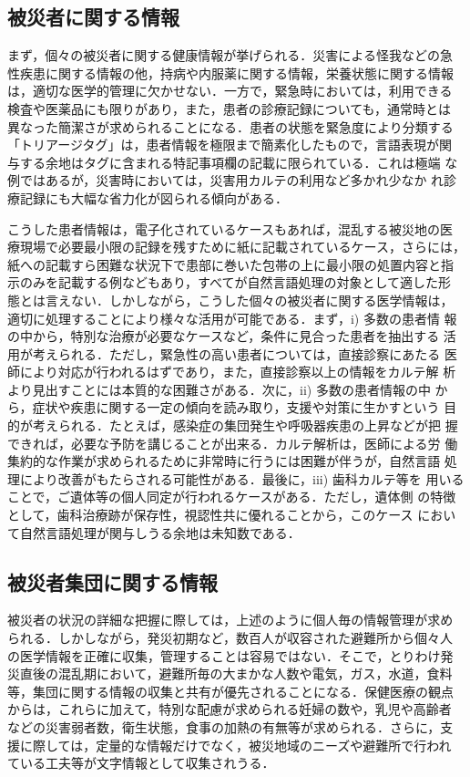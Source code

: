 \documentclass[japanese]{jnlp_1.4}
\begin{document}
\subsection{被災者に関する情報}

まず，個々の被災者に関する健康情報が挙げられる．災害による怪我などの急
性疾患に関する情報の他，持病や内服薬に関する情報，栄養状態に関する情報
は，適切な医学的管理に欠かせない．一方で，緊急時においては，利用できる
検査や医薬品にも限りがあり，また，患者の診療記録についても，通常時とは
異なった簡潔さが求められることになる．患者の状態を緊急度により分類する
「トリアージタグ」は，患者情報を極限まで簡素化したもので，言語表現が関
与する余地はタグに含まれる特記事項欄の記載に限られている．これは極端
な例ではあるが，災害時においては，災害用カルテの利用など多かれ少なか
れ診療記録にも大幅な省力化が図られる傾向がある．

こうした患者情報は，電子化されているケースもあれば，混乱する被災地の医
療現場で必要最小限の記録を残すために紙に記載されているケース，さらには，
紙への記載すら困難な状況下で患部に巻いた包帯の上に最小限の処置内容と指
示のみを記載する例などもあり，すべてが自然言語処理の対象として適した形
態とは言えない．しかしながら，こうした個々の被災者に関する医学情報は，
適切に処理することにより様々な活用が可能である．まず，i) 多数の患者情
報の中から，特別な治療が必要なケースなど，条件に見合った患者を抽出する
活用が考えられる．ただし，緊急性の高い患者については，直接診察にあたる
医師により対応が行われるはずであり，また，直接診察以上の情報をカルテ解
析より見出すことには本質的な困難さがある．次に，ii) 多数の患者情報の中
から，症状や疾患に関する一定の傾向を読み取り，支援や対策に生かすという
目的が考えられる．たとえば，感染症の集団発生や呼吸器疾患の上昇などが把
握できれば，必要な予防を講じることが出来る．カルテ解析は，医師による労
働集約的な作業が求められるために非常時に行うには困難が伴うが，自然言語
処理により改善がもたらされる可能性がある．最後に，iii) 歯科カルテ等を
用いることで，ご遺体等の個人同定が行われるケースがある．ただし，遺体側
の特徴として，歯科治療跡が保存性，視認性共に優れることから，このケース
において自然言語処理が関与しうる余地は未知数である．


\subsection{被災者集団に関する情報}

被災者の状況の詳細な把握に際しては，上述のように個人毎の情報管理が求め
られる．しかしながら，発災初期など，数百人が収容された避難所から個々人
の医学情報を正確に収集，管理することは容易ではない．そこで，とりわけ発
災直後の混乱期において，避難所毎の大まかな人数や電気，ガス，水道，食料
等，集団に関する情報の収集と共有が優先されることになる．保健医療の観点
からは，これらに加えて，特別な配慮が求められる妊婦の数や，乳児や高齢者
などの災害弱者数，衛生状態，食事の加熱の有無等が求められる．さらに，支
援に際しては，定量的な情報だけでなく，被災地域のニーズや避難所で行われ
ている工夫等が文字情報として収集されうる．
\end{document}
